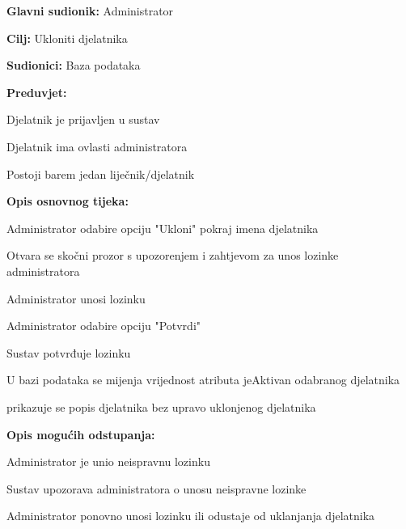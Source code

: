 				\noindent {}
				\begin{packed_item}
					
					\item \textbf{Glavni sudionik: }Administrator
					\item  \textbf{Cilj: }Ukloniti djelatnika
					\item  \textbf{Sudionici: }Baza podataka
					\item  \textbf{Preduvjet: }
					\item[] \begin{packed_enum}
						
						\item[-] Djelatnik je prijavljen u sustav
						\item[-] Djelatnik ima ovlasti administratora
						\item[-] Postoji barem jedan liječnik/djelatnik
					\end{packed_enum}
					\item  \textbf{Opis osnovnog tijeka: }
					
					\item[] \begin{packed_enum}
						\item Administrator odabire opciju "Ukloni" pokraj imena djelatnika
						\item Otvara se skočni prozor s upozorenjem i zahtjevom za unos lozinke administratora
						\item Administrator unosi lozinku
						\item Administrator odabire opciju "Potvrdi"
						\item Sustav potvrđuje lozinku
						\item U bazi podataka se mijenja vrijednost atributa jeAktivan odabranog djelatnika
						\item prikazuje se popis djelatnika bez upravo uklonjenog djelatnika
					\end{packed_enum}
					
					\item  \textbf{Opis mogućih odstupanja:}
					
					\item[] \begin{packed_item}
						
						\item[5.a] Administrator je unio neispravnu lozinku
						\item[] \begin{packed_enum}
							\item Sustav upozorava administratora o unosu neispravne lozinke 
							\item Administrator ponovno unosi lozinku ili odustaje od uklanjanja djelatnika					
						\end{packed_enum}
					\end{packed_item}
				\end{packed_item}
					
